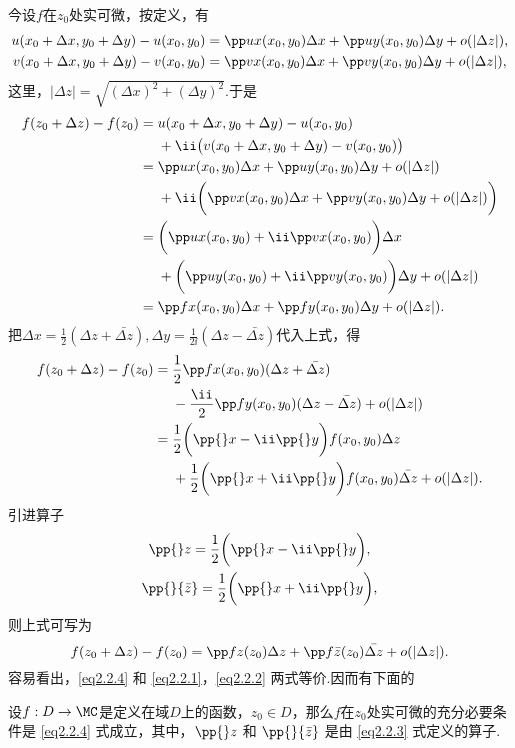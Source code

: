 今设$f$在$z_0$处实可微，按定义，有
\begin{gather}
u(x_0+\Delta x,y_0+\Delta y)-u(x_0,y_0)=\pp ux(x_0,y_0)\Delta x+\pp uy(x_0,y_0)\Delta y+o(|\Delta z|),\label{eq2.2.1}\\
v(x_0+\Delta x,y_0+\Delta y)-v(x_0,y_0)=\pp vx(x_0,y_0)\Delta x+\pp vy(x_0,y_0)\Delta y+o(|\Delta z|)\label{eq2.2.2},
\end{gather}
这里，$|\Delta z|=\sqrt{(\Delta x)^2+(\Delta y)^2}$.于是
\begin{align*}
  f(z_0+\Delta z)-f(z_0)={}&u(x_0+\Delta x,y_0+\Delta y)-u(x_0,y_0)\\
  &+  \ii\big(v(x_0+\Delta x,y_0+\Delta y)-v(x_0,y_0)\big)\\
  ={}&\pp ux(x_0,y_0)\Delta x+\pp uy(x_0,y_0)\Delta y+o(|\Delta z|)\\
  &+\ii\bigg(\pp vx(x_0,y_0)\Delta x+\pp vy(x_0,y_0)\Delta y+o(|\Delta z|)\bigg)\\
  ={}&\bigg(\pp ux(x_0,y_0)+\ii\pp vx(x_0,y_0)\bigg)\Delta x\\
  &+\bigg(\pp uy(x_0,y_0)+\ii\pp vy(x_0,y_0)\bigg)\Delta y+o(|\Delta z|)\\
  ={}&\pp fx(x_0,y_0)\Delta x+\pp fy(x_0,y_0)\Delta y+o(|\Delta z|).
\end{align*}
把$\Delta x=\frac12(\Delta z+\bar{\Delta z}),\Delta y=\frac1{2\ii}(\Delta z-\bar{\Delta z})$代入上式，得
\begin{align*}
  f(z_0+\Delta z)-f(z_0)={}&\frac12\pp fx(x_0,y_0)(\Delta z+\bar{\Delta z})\\
  &-\frac{\ii}2\pp fy(x_0,y_0)(\Delta z-\bar{\Delta z})+o(|\Delta z|)\\
  ={}&\frac12\bigg(\pp {}x-\ii\pp{}y\bigg)f(x_0,y_0)\Delta z\\
  &+\frac12\bigg(\pp{}x+\ii\pp{}y\bigg)f(x_0,y_0)\bar{\Delta z}+o(|\Delta z|).
\end{align*}
引进算子
\begin{equation}\label{eq2.2.3}
\begin{gathered}
  \pp{}z=\frac12\bigg(\pp{}x-\ii\pp{}y\bigg),\\
  \pp{}{\bar z}=\frac12\bigg(\pp{}x+\ii\pp{}y\bigg),
\end{gathered}
\end{equation}
则上式可写为
\begin{equation}\label{eq2.2.4}
  f(z_0+\Delta z)-f(z_0)=\pp fz(z_0)\Delta z+\pp f{\bar z}(z_0)\bar{\Delta z}+o(|\Delta z|).
\end{equation}
容易看出，\eqref{eq2.2.4} 和 \eqref{eq2.2.1}，\eqref{eq2.2.2} 两式等价.因而有下面的
\begin{prop}
设$f:D\to\MC$是定义在域$D$上的函数，$z_0\in D$，那么$f$在$z_0$处实可微的充分必要条件是  \eqref{eq2.2.4} 式成立，其中，$\pp{}z$ 和 $\pp{}{\bar z}$ 是由 \eqref{eq2.2.3} 式定义的算子.
\end{prop}

